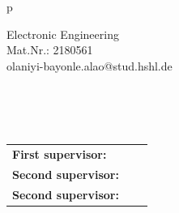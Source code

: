 \begin{center}
\begin{tabular}{p{\textwidth}}
\begin{center}
Electronic Engineering\\%
Mat.Nr.: 2180561\\
olaniyi-bayonle.alao@stud.hshl.de\\
\vspace{0.5cm}
\large{\mydate}


\end{center}

\\
\\
\\

\begin{center}
\begin{tabular}{lll}
\textbf{First supervisor:} & & \firstexaminer\\
\textbf{Second supervisor:} & & \secondexaminer\\
\textbf{Second supervisor:} & & \thirdexaminer\\
\end{tabular}
\end{center}

\end{tabular}
\end{center}